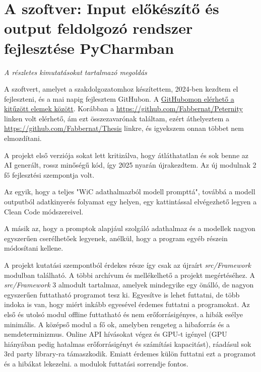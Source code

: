 \documentclass[12pt]{report}
\theoremstyle{definition}
\begin{document}
\newcommand{\chapterwithdesc}[2]{%
  \chapter{#1}%
  \vspace{-1ex}%
  {\large\itshape #2\par}%
  \vspace{2ex}%
}
\chapterwithdesc
  {A szoftver: Input előkészítő és output feldolgozó rendszer fejlesztése PyCharmban}
  {A részletes kimutatásokat tartalmazó megoldás}
\label{chap:src/Framework}

A szoftvert, amelyet a szakdolgozatomhoz készítettem, 2024-ben kezdtem el fejleszteni, és a mai napig fejlesztem GitHubon. A \href{https://github.com/Fabbernat}{GitHubomon elérhető a kitűzött elemek között}. Korábban a \href{https://github.com/Fabbernat/Peternity}{https://github.com/Fabbernat/Peternity} linken volt elérhető, ám ezt összezavarónak találtam, ezért áthelyeztem a \href{https://github.com/Fabbernat/Thesis} {https://github.com/Fabbernat/Thesis} linkre, és igyekszem onnan többet nem elmozdítani.

A projekt első verziója sokat lett kritizálva, hogy átláthatatlan és sok benne az AI generált, rossz minőségű kód, így 2025 nyarán újrakezdtem. Az új modulnak 2 fő fejlesztési szempontja volt.

Az egyik, hogy a teljes "WiC adathalmazból modell prompttá", továbbá a modell outputból adatkinyerés %
folyamat egy helyen, egy kattintással elvégezhető legyen a Clean Code módszereivel.

A másik az, hogy a promptok alapjául szolgáló adathalmaz és a modellek nagyon egyszerűen cserélhetőek legyenek, anélkül, hogy a program egyéb részein módosítani kellene.


A projekt kutatási szempontból érdekes része így csak az újraírt \textit{src/Framework} modulban található. A többi archívum és mellékelhető a projekt megértéséhez. A \textit{src/Framework} 3 almodult tartalmaz, amelyek mindegyike egy önálló, de nagyon egyszerűen futtatható programot tesz ki. Egyesítve is lehet futtatni, de több indoka is van, hogy miért inkább egyesével érdemes futtatni a programokat. Az első és utolsó modul offline futtatható és nem erőforrásigényes, a hibák esélye minimális. A középső modul a fő ok, amelyben rengeteg a hibaforrás és a nemdeterminizmus. Online API hívásokat végez és GPU-t igényel (GPU hiányában pedig hatalmas erőforrásigényt és számítási kapacitást), ráadásul sok 3rd party library-ra támaszkodik. Emiatt érdemes külön futtatni ezt a programot és a hibákat lekezelni. a modulok futtatási sorrendje fontos.
\end{document}
